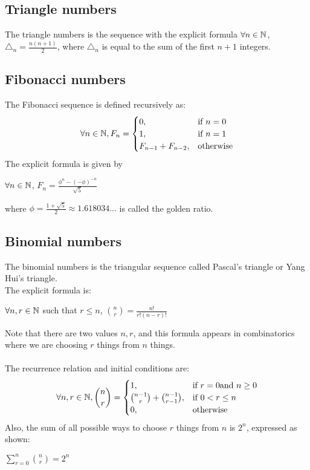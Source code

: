 \documentclass[a4paper]{article}
\begin{document}
\subsection{Triangle numbers}
The triangle numbers is the sequence with the explicit formula $\forall n \in \mathbb{N}$, $\triangle_n = \frac{n(n+1)}{2}$, where $\triangle_n$ is equal to the sum of the first $n+1$ integers.
\subsection{Fibonacci numbers}
The Fibonacci sequence is defined recursively as:
\[
\forall n \in \mathbb{N}, F_n=
\begin{cases}
0, & \text{if } n=0\\
1, & \text{if } n=1\\
F_{n-1} + F_{n-2}, & \text{otherwise}
\end{cases}
\]
The explicit formula is given by 
\begin{center}
	$\forall n \in \mathbb{N}$, $F_n = \frac{\phi^n - (-\phi)^{-n}}{\sqrt{5}}$
\end{center}
where $\phi = \frac{1 + \sqrt{5}}{2} \approx 1.618034...$ is called the golden ratio.

\subsection{Binomial numbers}
The binomial numbers is the triangular sequence called Pascal's triangle or Yang Hui's triangle.\\
The explicit formula is:
\begin{center}
	$\forall n, r \in \mathbb{N}$ such that $r \le n$, ${n\choose r} = \frac{n!}{r!(n-r)!}$
\end{center}
Note that there are two values $n, r$, and this formula appears in combinatorics where we are choosing $r$ things from $n$ things.\\ \\
The recurrence relation and initial conditions are:
\[
\forall n,r \in \mathbb{N}, {n\choose r}=
\begin{cases}
1, & \text{if } r=0 \text{and } n\ge 0\\
{n-1\choose r} + {n-1\choose r-1}, & \text{if } 0<r\le n\\
0, & \text{otherwise}
\end{cases}
\]
Also, the sum of all possible ways to choose $r$ things from $n$ is $2^n$, expressed as shown:
\begin{center}
	$\sum\limits_{r=0}^{n}{n\choose r} = 2^n$
\end{center}
\end{document}
